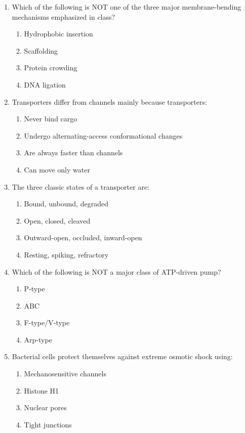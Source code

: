 \documentclass[12pt,fontset=none]{ctexart}
\begin{document}
\begin{enumerate}
\item Which of the following is NOT one of the three major membrane-bending mechanisms emphasized in class?
\begin{enumerate}[label=\alph*.]
\item Hydrophobic insertion
\item Scaffolding
\item Protein crowding
\item DNA ligation
\end{enumerate}

\item Transporters differ from channels mainly because transporters:
\begin{enumerate}[label=\alph*.]
\item Never bind cargo
\item Undergo alternating-access conformational changes
\item Are always faster than channels
\item Can move only water
\end{enumerate}

\item The three classic states of a transporter are:
\begin{enumerate}[label=\alph*.]
\item Bound, unbound, degraded
\item Open, closed, cleaved
\item Outward-open, occluded, inward-open
\item Resting, spiking, refractory
\end{enumerate}

\item Which of the following is NOT a major class of ATP-driven pump?
\begin{enumerate}[label=\alph*.]
\item P-type
\item ABC
\item F-type/V-type
\item Arp-type
\end{enumerate}

\item Bacterial cells protect themselves against extreme osmotic shock using:
\begin{enumerate}[label=\alph*.]
\item Mechanosensitive channels
\item Histone H1
\item Nuclear pores
\item Tight junctions
\end{enumerate}


\end{enumerate}
\end{document}
